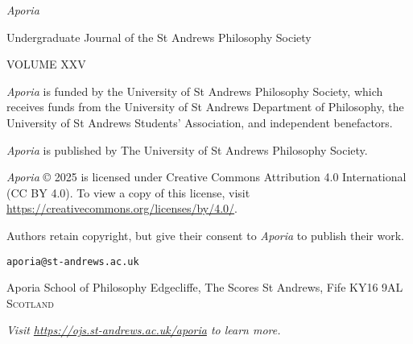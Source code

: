 \thispagestyle{empty}

\noindent
{\huge\textit{Aporia}}

\vspace{1cm}

\normalsize
\noindent Undergraduate Journal of the St Andrews Philosophy
Society

\vspace{1cm}
\noindent VOLUME XXV


\vspace{3cm}
\vfill

\noindent \textit{Aporia} is funded by the University of St
Andrews Philosophy Society, which receives funds from the
University of St Andrews
Department of Philosophy, the University of St Andrews
Students’ Association, and independent benefactors.

\noindent
\textit{Aporia} is published by The University of St Andrews
Philosophy Society.

\vspace{1cm}
\noindent
\textit{Aporia} © 2025 is licensed under Creative Commons
Attribution 4.0 International (CC BY 4.0). To view a copy of
this license, visit
\url{https://creativecommons.org/licenses/by/4.0/}.

\vspace{1cm}
\noindent
Authors retain copyright, but give their consent to
\textit{Aporia} to publish their work.

\vspace{2cm}
\begin{multicols}{2}
\noindent
\texttt{aporia@st-andrews.ac.uk}

\vspace{1cm}
\noindent
Aporia\newline
School of Philosophy\newline
Edgecliffe, The Scores\newline
St Andrews, Fife\newline
KY16 9AL\newline
\textsc{Scotland}

\columnbreak
\noindent
\textit{Visit \url{https://ojs.st-andrews.ac.uk/aporia} to learn more.}
\end{multicols}

